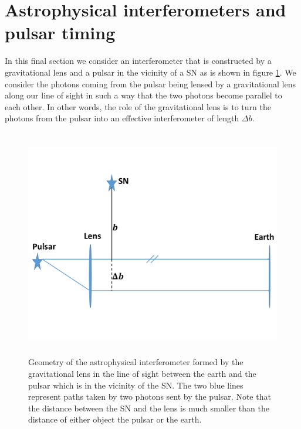 \documentclass[aps,showpacs,twocolumn,floats,prd,superscriptaddress,nofootinbib]{revtex4-1}
\begin{document}
\section{Astrophysical interferometers and pulsar timing}

In this final section we consider an interferometer that is constructed by a gravitational lens and a pulsar in the vicinity of a SN as is shown in figure \ref{fig:4}. We consider the photons coming from the pulsar being lensed by a gravitational lens along our line of sight in such a way that the two photons become parallel to each other. In other words, the role of the gravitational lens is to turn the photons from the pulsar into an effective interferometer of length $\Delta b$. 

\onecolumngrid

\begin{figure}[h!]
\begin{center}
\includegraphics[width=\textwidth,height=10cm]{Lens.pdf}
\caption{Geometry of the astrophysical interferometer formed by the gravitational lens in the line of sight between the earth and the pulsar which is in the vicinity of the SN. The two blue lines represent paths taken by two photons sent by the pulsar. Note that the distance between the SN and the lens is much smaller than the distance of either object the pulsar or the earth.}
\label{fig:4}
\end{center}
\end{figure}

\twocolumngrid
\end{document}
